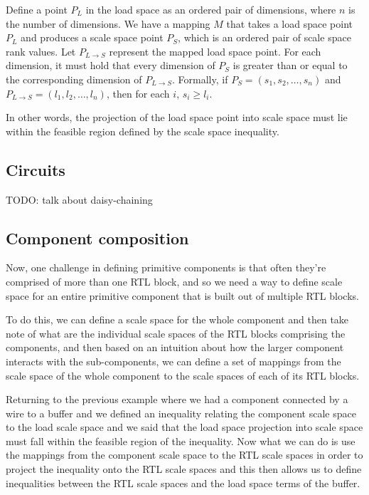Define a point $P_L$ in the load space as an ordered pair of dimensions, where $n$ is the number of dimensions. We have a mapping $M$ that takes a load space point $P_L$ and produces a scale space point $P_S$, which is an ordered pair of scale space rank values. Let $P_{L \rightarrow S}$ represent the mapped load space point. For each dimension, it must hold that every dimension of $P_S$ is greater than or equal to the corresponding dimension of $P_{L \rightarrow S}$. Formally, if $P_S = (s_1, s_2, \ldots, s_n)$ and $P_{L \rightarrow S} = (l_1, l_2, \ldots, l_n)$, then for each $i$, $s_i \geq l_i$.

In other words, the projection of the load space point into scale space must lie within the feasible region defined by the scale space inequality.

\subsection{Circuits}

TODO: talk about daisy-chaining

\subsection{Component composition}

Now, one challenge in defining primitive components is that often they're comprised of more than one RTL block, and so we need a way to define scale space for an entire primitive component that is built out of multiple RTL blocks.

To do this, we can define a scale space for the whole component and then take note of what are the individual scale spaces of the RTL blocks comprising the components, and then based on an intuition about how the larger component interacts with the sub-components, we can define a set of mappings from the scale space of the whole component to the scale spaces of each of its RTL blocks.

Returning to the previous example where we had a component connected by a wire to a buffer and we defined an inequality relating the component scale space to the load scale space and we said that the load space projection into scale space must fall within the feasible region of the inequality. Now what we can do is use the mappings from the component scale space to the RTL scale spaces in order to project the inequality onto the RTL scale spaces and this then allows us to define inequalities between the RTL scale spaces and the load space terms of the buffer.

